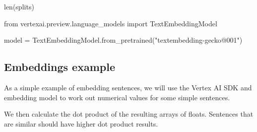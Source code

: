 \documentclass[
  letterpaper,
  DIV=11,
  numbers=noendperiod]{scrreprt}
\newenvironment{Shaded}{\begin{snugshade}}{\end{snugshade}}
\newcommand{\BuiltInTok}[1]{\textcolor[rgb]{0.00,0.23,0.31}{#1}}
\newcommand{\ImportTok}[1]{\textcolor[rgb]{0.00,0.46,0.62}{#1}}
\newcommand{\NormalTok}[1]{\textcolor[rgb]{0.00,0.23,0.31}{#1}}
\newcommand{\OperatorTok}[1]{\textcolor[rgb]{0.37,0.37,0.37}{#1}}
\newcommand{\StringTok}[1]{\textcolor[rgb]{0.13,0.47,0.30}{#1}}
\begin{document}
\begin{Shaded}
\begin{Highlighting}[]
\BuiltInTok{len}\NormalTok{(splits)}
\end{Highlighting}
\end{Shaded}

\begin{Shaded}
\begin{Highlighting}[]
\ImportTok{from}\NormalTok{ vertexai.preview.language\_models }\ImportTok{import}\NormalTok{ TextEmbeddingModel}

\NormalTok{model }\OperatorTok{=}\NormalTok{ TextEmbeddingModel.from\_pretrained(}\StringTok{"textembedding{-}gecko@001"}\NormalTok{)}
\end{Highlighting}
\end{Shaded}

\hypertarget{embeddings-example}{%
\subsection{Embeddings example}\label{embeddings-example}}

As a simple example of embedding sentences, we will use the Vertex AI
SDK and embedding model to work out numerical values for some simple
sentences.

We then calculate the dot product of the resulting arrays of floats.
Sentences that are similar should have higher dot product results.
\end{document}
